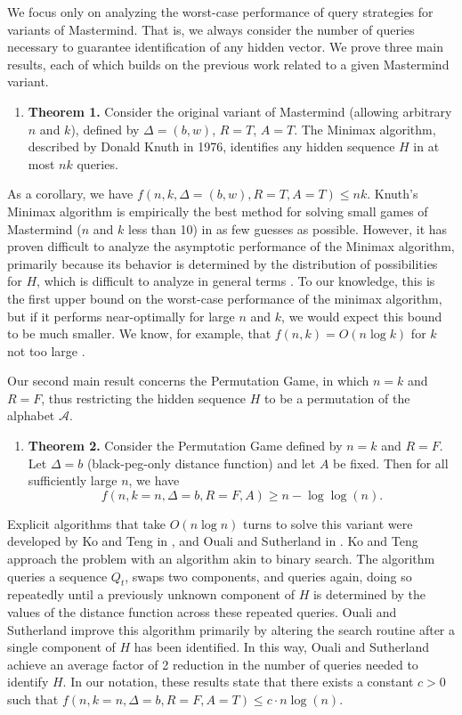 \documentclass[12pt, a4paper]{article}
\begin{document}
We focus only on analyzing the worst-case performance of query strategies for variants of Mastermind. That is, we always consider the number of queries necessary to guarantee identification of any hidden vector. We prove three main results, each of which builds on the previous work related to a given Mastermind variant.
\begin{enumerate}[label=]
	\item\textbf{Theorem 1.} Consider the original variant of Mastermind (allowing arbitrary $n$ and $k$), defined by $\Delta=(b, w)$, $R=T$, $A=T$. The Minimax algorithm, described by Donald Knuth in 1976, identifies any hidden sequence $H$ in at most $nk$ queries.
\end{enumerate}
As a corollary, we have $f(n, k, \Delta=(b,w), R=T, A=T)\le nk$. Knuth's Minimax algorithm is empirically the best method for solving small games of Mastermind ($n$ and $k$ less than 10) in as few guesses as possible. However, it has proven difficult to analyze the asymptotic performance of the Minimax algorithm, primarily because its behavior is determined by the distribution of possibilities for $H$, which is difficult to analyze in general terms \cite{KT86, OS13}. To our knowledge, this is the first upper bound on the worst-case performance of the minimax algorithm, but if it performs near-optimally for large $n$ and $k$, we would expect this bound to be much smaller. We know, for example, that $f(n,k) = O(n \log k)$ for $k$ not too large \cite{DK76, KT86}.

Our second main result concerns the Permutation Game, in which $n=k$ and $R=F$, thus restricting the hidden sequence $H$ to be a permutation of the alphabet $\mathcal{A}$.
\begin{enumerate}[label=]
	\item\textbf{Theorem 2.} Consider the Permutation Game defined by $n = k$ and $R = F$. Let $\Delta = b$ (black-peg-only distance function) and let $A$ be fixed. Then for all sufficiently large $n$, we have
	\begin{equation*}
		f(n, k = n, \Delta = b, R = F, A) \ge n - \log\log(n).
	\end{equation*}
\end{enumerate}
Explicit algorithms that take $O(n \log n)$ turns to solve this variant were developed by Ko and Teng in \cite{KT86}, and Ouali and Sutherland in \cite{OS13}. Ko and Teng approach the problem with an algorithm akin to binary search. The algorithm queries a sequence $Q_t$, swaps two components, and queries again, doing so repeatedly until a previously unknown component of $H$ is determined by the values of the distance function across these repeated queries. Ouali and Sutherland improve this algorithm primarily by altering the search routine after a single component of $H$ has been identified. In this way, Ouali and Sutherland achieve an average factor of 2 reduction in the number of queries needed to identify $H$. In our notation, these results state that there exists a constant $c>0$ such that $f(n, k=n, \Delta=b, R = F, A = T)\le c\cdot n\log(n)$.
\end{document}
